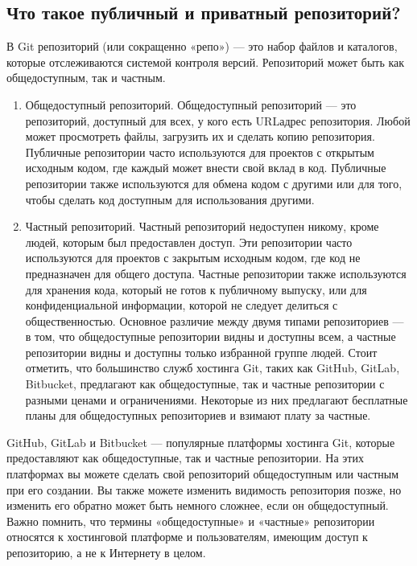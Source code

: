 \documentclass[letterpaper,10pt,russian]{sphinxmanual}
\begin{document}
\subsection{Что такое публичный и приватный репозиторий?}
\label{\detokenize{educational_materials/git_base/content:id10}}
\sphinxAtStartPar
В Git репозиторий (или сокращенно «репо») — это набор файлов и каталогов, которые отслеживаются системой контроля версий. Репозиторий может быть как общедоступным, так и частным.
\begin{enumerate}
%
\item {} 
\sphinxAtStartPar
Общедоступный репозиторий. Общедоступный репозиторий — это репозиторий, доступный для всех, у кого есть URL\sphinxhyphen{}адрес репозитория. Любой может просмотреть файлы, загрузить их и сделать копию репозитория. Публичные репозитории часто используются для проектов с открытым исходным кодом, где каждый может внести свой вклад в код. Публичные репозитории также используются для обмена кодом с другими или для того, чтобы сделать код доступным для использования другими.

\item {} 
\sphinxAtStartPar
Частный репозиторий. Частный репозиторий недоступен никому, кроме людей, которым был предоставлен доступ. Эти репозитории часто используются для проектов с закрытым исходным кодом, где код не предназначен для общего доступа. Частные репозитории также используются для хранения кода, который не готов к публичному выпуску, или для конфиденциальной информации, которой не следует делиться с общественностью.
Основное различие между двумя типами репозиториев — в том, что общедоступные репозитории видны и доступны всем, а частные репозитории видны и доступны только избранной группе людей.
Стоит отметить, что большинство служб хостинга Git, таких как GitHub, GitLab, Bitbucket, предлагают как общедоступные, так и частные репозитории с разными ценами и ограничениями. Некоторые из них предлагают бесплатные планы для общедоступных репозиториев и взимают плату за частные.

\end{enumerate}

\sphinxAtStartPar
GitHub, GitLab и Bitbucket — популярные платформы хостинга Git, которые предоставляют как общедоступные, так и частные репозитории. На этих платформах вы можете сделать свой репозиторий общедоступным или частным при его создании. Вы также можете изменить видимость репозитория позже, но изменить его обратно может быть немного сложнее, если он общедоступный.
Важно помнить, что термины «общедоступные» и «частные» репозитории относятся к хостинговой платформе и пользователям, имеющим доступ к репозиторию, а не к Интернету в целом.
\end{document}
